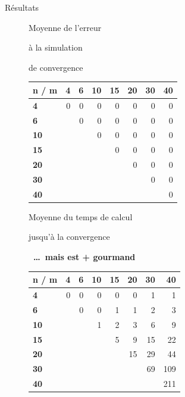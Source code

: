 \documentclass[10pt,xcolor=table,color={dvipsnames,usenames},ignorenonframetext,usepdftitle=false,french]{beamer}
\begin{document}
\begin{frame}{Résultats}
\begin{figure}
\begin{minipage}{.4\textwidth}
\normalsize{Moyenne de l'erreur

à la simulation

de convergence
}
\end{minipage}%
\begin{minipage}{.6\textwidth}

\begin{tabular}{>{\bfseries}l|r|r|r|r|r|r|r}
\hline
\textbf{n / m } & \textbf{4} & \textbf{6} & \textbf{10} & \textbf{15} & \textbf{20} & \textbf{30} & \textbf{40}\\
\hline
4 & 0 & 0 & 0 & 0 & 0 & 0 & 0\\
\hline
6 &  & 0 & 0 & 0 & 0 & 0 & 0\\
\hline
10 &  &  & 0 & 0 & 0 & 0 & 0\\
\hline
15 &  &  &  & 0 & 0 & 0 & 0\\
\hline
20 &  &  &  &  & 0 & 0 & 0\\
\hline
30 &  &  &  &  &  & 0 & 0\\
\hline
40 &  &  &  &  &  &  & 0\\
\hline
\end{tabular}
\end{minipage}
\end{figure}

\begin{figure}
\begin{minipage}{.4\textwidth}
\normalsize{Moyenne du temps de calcul

jusqu'à la convergence

\faArrowCircleRight \textbf{\ \dots \ mais est + gourmand}
}
\end{minipage}%
\begin{minipage}{.6\textwidth}

\begin{tabular}{>{\bfseries}l|r|r|r|r|r|r|r}
\hline
\textbf{n / m } & \textbf{4} & \textbf{6} & \textbf{10} & \textbf{15} & \textbf{20} & \textbf{30} & \textbf{40}\\
\hline
4 & 0 & 0 & 0 & 0 & 0 & 1 & 1\\
\hline
6 &  & 0 & 0 & 1 & 1 & 2 & 3\\
\hline
10 &  &  & 1 & 2 & 3 & 6 & 9\\
\hline
15 &  &  &  & 5 & 9 & 15 & 22\\
\hline
20 &  &  &  &  & 15 & 29 & 44\\
\hline
30 &  &  &  &  &  & 69 & 109\\
\hline
40 &  &  &  &  &  &  & 211\\
\hline
\end{tabular}
\end{minipage}
\end{figure}

\normalsize

\end{frame}
\end{document}
